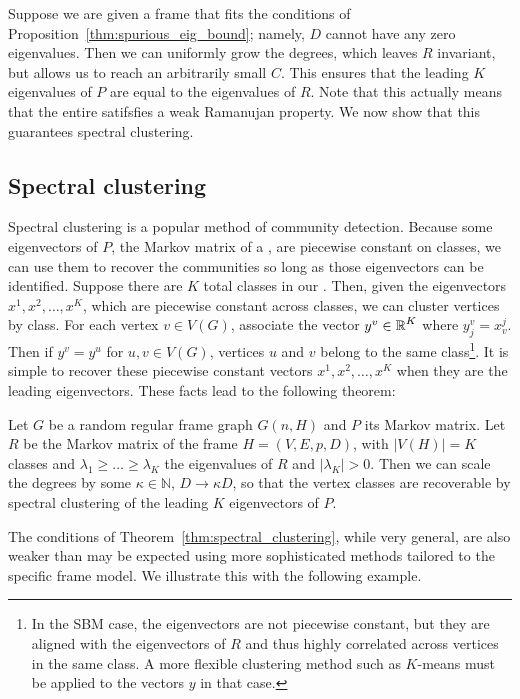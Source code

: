 Suppose we are given a frame that fits the conditions of 
Proposition~\ref{thm:spurious_eig_bound};
namely, $D$ cannot have any zero eigenvalues.
Then we can uniformly grow the degrees, which leaves $R$ invariant,
but allows us to reach an arbitrarily small $C$.
This ensures that the leading $K$ eigenvalues of $P$ are equal to the 
eigenvalues of $R$.
Note that this actually means that the entire \kframe satifsfies 
a weak Ramanujan property.
We now show that this guarantees spectral clustering.

\subsection{Spectral clustering}

Spectral clustering is a popular method of community detection.
Because some eigenvectors of $P$, the Markov matrix of a \kframe,
are piecewise constant on classes, 
we can use them to recover the communities so long as those eigenvectors can be identified.
Suppose there are $K$ total classes in our \kframe.
Then, given the eigenvectors $x^1, x^2, \ldots, x^K$, which are piecewise constant across classes,
we can cluster vertices by class.
For each vertex $v \in V(G)$, associate the vector
$y^v \in \operatorname{\mathbb{R}}^K$
where $y^v_j = x^j_v$.
Then if $y^v = y^u$ for $u, v \in V(G)$, 
vertices $u$ and $v$ belong to the same class\footnote{
In the SBM case, the eigenvectors are not piecewise constant, 
but they are aligned with the eigenvectors of $R$
and thus highly correlated across vertices in the same class.
A more flexible clustering method such as $K$-means must be applied to the vectors $y$
in that case.
}.
It is simple to recover these piecewise constant vectors
$x^1, x^2, \ldots, x^K$ when they are the leading eigenvectors.
These facts lead to the following theorem:

\begin{theorem}
\label{thm:spectral_clustering}
Let $G$ be a random regular frame graph $G(n,H)$
and $P$ its Markov matrix.
Let $R$ be the Markov matrix of the frame $H=(V,E,p,D)$, 
with $|V(H)| = K$ classes
and $\lambda_1 \ge \ldots \ge \lambda_K$ the eigenvalues of $R$
and $|\lambda_K| > 0$. 
Then we can scale the degrees by some $\kappa \in \mathbb{N}$,
$D \to \kappa D$,
so that the vertex classes are recoverable by spectral clustering of 
the leading $K$ eigenvectors of $P$.
\end{theorem}

\begin{remark}
The conditions of Theorem~\ref{thm:spectral_clustering},
while very general, are also weaker than may be expected using more sophisticated methods
tailored to the specific frame model. 
We illustrate this with the following example.
\end{remark}

